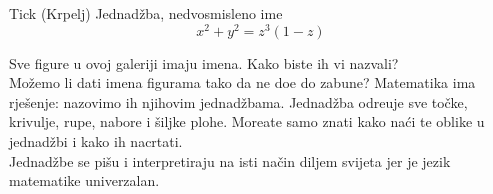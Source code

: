 \begin{surferPage}{Tick (Krpelj)}
Jednad\v{z}ba, nedvosmisleno ime\\
\smallskip
\[x^2 + y^2	= z^3	(1 - z) \]


\singlespacing
Sve figure u ovoj galeriji imaju imena. Kako biste ih vi nazvali?\\
\vspace{0.3cm}
Mo\v{z}emo li dati imena figurama tako da ne do\dj{}e do zabune? Matematika ima rje\v{s}enje: nazovimo ih njihovim jednad\v{z}bama. Jednad\v{z}ba odre\dj{}uje sve to\v{c}ke, krivulje, rupe, nabore i \v{s}iljke plohe. Moreate samo znati kako na\'{c}i te oblike u jednad\v{z}bi i kako ih nacrtati. \\
\vspace{0.3cm}
Jednad\v{z}be se pi\v{s}u i interpretiraju na isti na\v{c}in diljem svijeta jer je jezik matematike univerzalan.
\end{surferPage}
